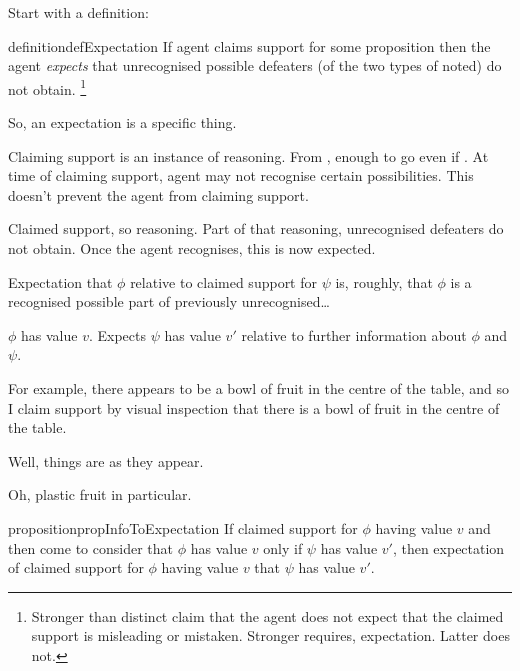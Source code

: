\begin{note}
  Start with a definition:

  \begin{restatable}{definition}{defExpectation}\label{def:expectation}
    If agent claims support for some proposition then the agent \emph{expects} that unrecognised possible defeaters (of the two types of noted) do not obtain.\nolinebreak
    \footnote{
      Stronger than distinct claim that the agent does not expect that the claimed support is misleading or mistaken.
      Stronger requires, expectation.
      Latter does not.
    }
  \end{restatable}
  So, an expectation is a specific thing.

  Claiming support is an instance of reasoning.
  From \eiS{}, enough to go even if \mom{}.
  At time of claiming support, agent may not recognise certain possibilities.
  This doesn't prevent the agent from claiming support.

  Claimed support, so reasoning.
  Part of that reasoning, unrecognised defeaters do not obtain.
  Once the agent recognises, this is now expected.

  Expectation that \(\phi\) relative to claimed support for \(\psi\) is, roughly, that \(\phi\) is a recognised possible part of previously unrecognised\dots
\end{note}

\begin{note}
  \(\phi\) has value \(v\).
  Expects \(\psi\) has value \(v'\) relative to further information about \(\phi\) and \(\psi\).
\end{note}

\begin{note}
  For example, there appears to be a bowl of fruit in the centre of the table, and so I claim support by visual inspection that there is a bowl of fruit in the centre of the table.

  Well, things are as they appear.

  Oh, plastic fruit in particular.
\end{note}

\begin{note}
  \begin{restatable}[]{proposition}{propInfoToExpectation}\label{prop:info-to-expectation}
    If claimed support for \(\phi\) having value \(v\) and then come to consider that \(\phi\) has value \(v\) only if \(\psi\) has value \(v'\), then expectation of claimed support for \(\phi\) having value \(v\) that \(\psi\) has value \(v'\).
  \end{restatable}
\end{note}


